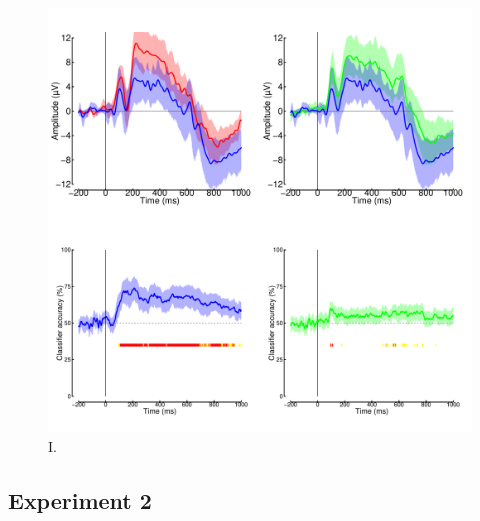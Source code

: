 \documentclass[
]{article}
\begin{document}
\begin{figure}

{\centering \includegraphics{Figures/RobotsMVPA} 

}

\caption{I.}\label{fig:RobotsMVPA}
\end{figure}

\hypertarget{experiment-2}{%
\subsection{Experiment 2}\label{experiment-2}}
\end{document}
